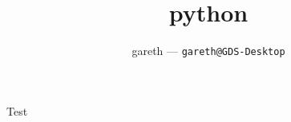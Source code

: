 \documentclass[11pt]{article}
\title{
	python
}
\author{
	gareth --- \texttt{gareth@GDS-Desktop}
}
\begin{document}
\maketitle

Test
\end{document}
